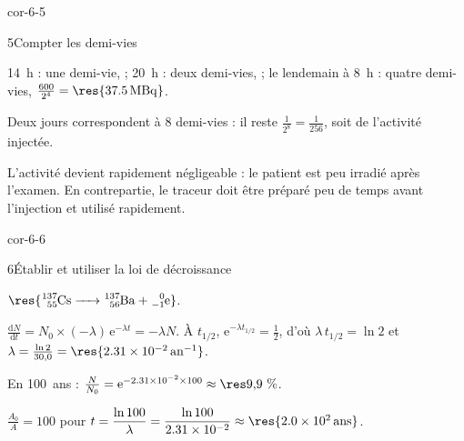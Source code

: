 \begin{blocLivre}{cor-6-5}
\begin{corrige}{5}{Compter les demi-vies}
\begin{questions}
\item 14~h : une demi-vie,  ; 20~h : deux demi-vies,  ; le lendemain à 8~h :
quatre demi-vies, $\frac{600}{2^4}=\res{\qty{37,5}{MBq}}$.
\item Deux jours correspondent à 8 demi-vies : il reste $\frac{1}{2^8}=\frac{1}{256}$, soit  de l'activité injectée.
\item L'activité devient rapidement négligeable : le patient est peu irradié après l'examen. En contrepartie, le
traceur doit être préparé peu de temps avant l'injection et utilisé rapidement.
\end{questions}
\end{corrige}
\end{blocLivre}
\begin{blocLivre}{cor-6-6}
\begin{corrige}{6}{Établir et utiliser la loi de décroissance}
\begin{questions}
\item $\res{\ce{^{137}_{55}Cs -> ^{137}_{56}Ba + ^{0}_{-1}e}}$.
\item $\frac{\mathrm{d}N}{\mathrm{d}t}=N_0\times(-\lambda)\,\mathrm{e}^{-\lambda t}=-\lambda N$. À $t_{1/2}$, $\mathrm{e}^{-\lambda t_{1/2}}=\frac12$,
d'où $\lambda\,t_{1/2}=\ln2$ et $\lambda=\frac{\ln2}{30{,}0}=\res{\qty{2,31e-2}{an^{-1}}}$.
\item En 100~ans : $\frac{N}{N_0}=\mathrm{e}^{-\num{2.31e-2}\times100}\approx\res{9{,}9~\%}$.
\item $\frac{A_0}{A}=100$ pour $t=\dfrac{\ln100}{\lambda}=\dfrac{\ln100}{\num{2.31e-2}}\approx\res{\qty{2,0e2}{ans}}$.
\end{questions}
\end{corrige}
\end{blocLivre}
